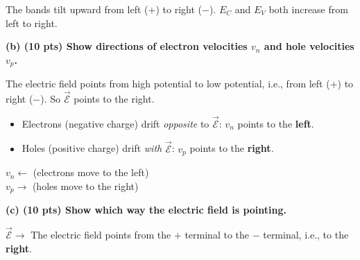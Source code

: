 \documentclass[11pt]{article}
\begin{document}
\begin{answerbox}
  \begin{center}
  \end{center}

  The bands tilt upward from left ($+$) to right ($-$). $E_C$ and $E_V$ both increase from left to right.
\end{answerbox}

\textbf{(b) (10 pts) Show directions of electron velocities $v_n$ and hole velocities $v_p$.}

The electric field points from high potential to low potential, i.e., from left ($+$) to right ($-$). So $\vec{\mathcal{E}}$ points to the right.

\begin{itemize}
  \item Electrons (negative charge) drift \emph{opposite} to $\vec{\mathcal{E}}$: $v_n$ points to the \textbf{left}.
  \item Holes (positive charge) drift \emph{with} $\vec{\mathcal{E}}$: $v_p$ points to the \textbf{right}.
\end{itemize}

\begin{answerbox}
  $v_n \leftarrow$ (electrons move to the left) \\
  $v_p \rightarrow$ (holes move to the right)
\end{answerbox}

\textbf{(c) (10 pts) Show which way the electric field is pointing.}

\begin{answerbox}
  $\vec{\mathcal{E}} \rightarrow$ The electric field points from the $+$ terminal to the $-$ terminal, i.e., to the \textbf{right}.
\end{answerbox}
\end{document}

